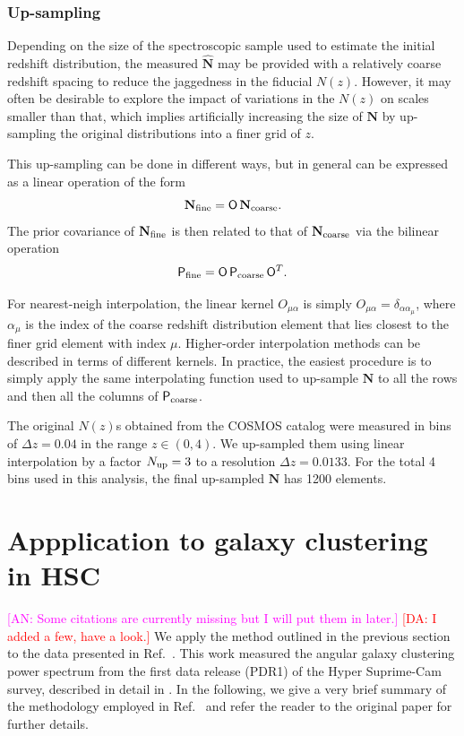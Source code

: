 \documentclass[a4paper,11pt]{article}
\newcommand{\an}[1]{{\textcolor{magenta}{[AN: #1]}}}
\newcommand{\da}[1]{{\textcolor{red}{[DA: #1]}}}
\newcommand{\vN}{\mathbf{N}}
\begin{document}
    \subsubsection{Up-sampling}\label{sssec:theory.prior.ups}
      Depending on the size of the spectroscopic sample used to estimate the initial redshift distribution, the measured $\hat{\vN}$ may be provided with a relatively coarse redshift spacing to reduce the jaggedness in the fiducial $N(z)$. However, it may often be desirable to explore the impact of variations in the $N(z)$ on scales smaller than that, which implies artificially increasing the size of $\vN$ by up-sampling the original distributions into a finer grid of $z$.
      
      This up-sampling can be done in different ways, but in general can be expressed as a linear operation of the form
      \begin{equation}
        \vN_{\rm fine}={\sf O}\,\vN_{\rm coarse}.
      \end{equation}
      The prior covariance of $\vN_{\rm fine}$ is then related to that of $\vN_{\rm coarse}$ via the bilinear operation
      \begin{equation}
        {\sf P}_{\rm fine}={\sf O}\,{\sf P}_{\rm coarse}\,{\sf O}^T.
      \end{equation}
      
      For nearest-neigh interpolation, the linear kernel $O_{\mu\alpha}$ is simply $O_{\mu\alpha}=\delta_{\alpha\alpha_\mu}$, where $\alpha_\mu$ is the index of the coarse redshift distribution element that lies closest to the finer grid element with index $\mu$. Higher-order interpolation methods can be described in terms of different kernels. In practice, the easiest procedure is to simply apply the same interpolating function used to up-sample $\vN$ to all the rows and then all the columns of ${\sf P}_{\rm coarse}$.
      
      The original $N(z)$s obtained from the COSMOS catalog were measured in bins of $\Delta z=0.04$ in the range $z\in(0,4)$. We up-sampled them using linear interpolation by a factor $N_{\rm up}=3$ to a resolution $\Delta z=0.0133$. For the total 4 bins used in this analysis, the final up-sampled $\vN$ has 1200 elements.

  \section{Appplication to galaxy clustering in HSC}\label{sec:hsc}
    \an{Some citations are currently missing but I will put them in later.} \da{I added a few, have a look.}
    We apply the method outlined in the previous section to the data presented in Ref.~\cite{1912.08209}. This work measured the angular galaxy clustering power spectrum from the first data release (PDR1) of the Hyper Suprime-Cam survey, described in detail in \cite{2018PASJ...70S...8A,2018PASJ...70S..25M,2018PASJ...70S...5B}. In the following, we give a very brief summary of the methodology employed in Ref.~\cite{1912.08209} and refer the reader to the original paper for further details.
    
\end{document}
